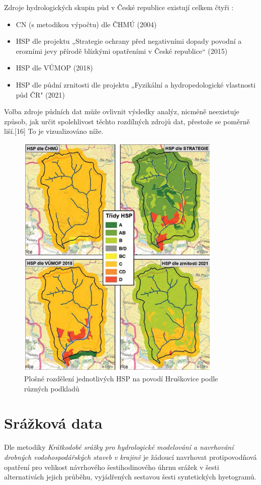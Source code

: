 \documentclass[a4paper,oneside,12pt]{book}
\begin{document}
Zdroje hydrologických skupin půd v České republice existují celkem čtyři \cite{Strouhal2022}:
\begin{itemize}
\item CN (s metodikou výpočtu) dle ČHMÚ (2004)
\item HSP dle projektu „Strategie ochrany před negativními dopady povodní a erozními jevy přírodě blízkými opatřeními v České republice“ (2015)
\item HSP dle VÚMOP (2018) 
\item HSP dle půdní zrnitosti dle projektu „Fyzikální a hydropedologické vlastnosti půd ČR" (2021)
\end{itemize}
\hspace{10mm} Volba zdroje půdních dat může ovlivnit výsledky analýz, nicméně neexistuje způsob, jak určit spolehlivost těchto rozdílných zdrojů dat, přestože se poměrně liší.[16] To je vizualizováno níže.

\begin{figure}[H] \label{obr4}
\centering
\includegraphics[height=12cm]{pictures/HSPmapa.png}
\caption{Plošné rozdělení jednotlivých HSP na povodí Hruškovice podle různých podkladů \cite{Strouhal2022}}
\label{fig:hsp}
\end{figure}

\section{Srážková data} \label{rain}
\hspace{10mm} Dle metodiky \textit{Krátkodobé srážky pro hydrologické modelování a navrhování drobných vodohospodářských staveb v krajině} \cite{MNYDGwleJOjKLRU2} je žádoucí navrhovat protipovodňová opatření pro velikost návrhového šestihodinového úhrnu srážek v šesti alternativách jejich průběhu, vyjádřených sestavou šesti syntetických hyetogramů. 
\end{document}
